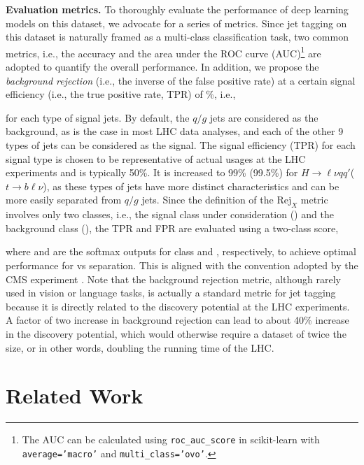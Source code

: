 \documentclass[nohyperref]{article}
\theoremstyle{plain}
\theoremstyle{definition}
\theoremstyle{remark}
\newcommand{\rej}[1]{\ensuremath{\text{Rej}_{#1}}\xspace}
\newcommand{\hlvqq}{\ensuremath{H\to \ell \nu q q'}\xspace}
\newcommand{\tblv}{\ensuremath{t\to b \ell \nu}\xspace}
\newcommand{\qgj}{\ensuremath{q/g}\xspace}
\begin{document}
\textbf{Evaluation metrics.} To thoroughly evaluate the performance of deep learning models on this dataset, we advocate for a series of metrics. Since jet tagging on this dataset is naturally framed as a multi-class classification task, two common metrics, i.e., the accuracy and the area under the ROC curve (AUC)\footnote{The AUC can be calculated using \texttt{roc\_auc\_score} in scikit-learn with \texttt{average='macro'} and \texttt{multi\_class='ovo'}.} are adopted to quantify the overall performance. In addition, we propose the \textit{background rejection} (i.e., the inverse of the false positive rate) at a certain signal efficiency (i.e., the true positive rate, TPR) of \%, i.e., 

for each type of signal jets. By default, the \qgj jets are considered as the background, as is the case in most LHC data analyses, and each of the other 9 types of jets can be considered as the signal. The signal efficiency (TPR) for each signal type is chosen to be representative of actual usages at the LHC experiments and is typically 50\%. It is increased to 99\% (99.5\%) for \hlvqq (\tblv), as these types of jets have more distinct characteristics and can be more easily separated from \qgj jets. Since the definition of the \rej{X} metric involves only two classes, i.e., the signal class under consideration () and the background class (), the TPR and FPR are evaluated using a two-class score, 

where  and  are the softmax outputs for class  and , respectively, to achieve optimal performance for  vs  separation. 
This is aligned with the convention adopted by the CMS experiment \cite{CMS:2020poo}. Note that the background rejection metric, although rarely used in vision or language tasks, is actually a standard metric for jet tagging because it is directly related to the discovery potential at the LHC experiments. A factor of two increase in background rejection can lead to about 40\% increase in the discovery potential, which would otherwise require a dataset of twice the size, or in other words, doubling the running time of the LHC. 


\section{Related Work}
\label{sec:related-work}
\end{document}
